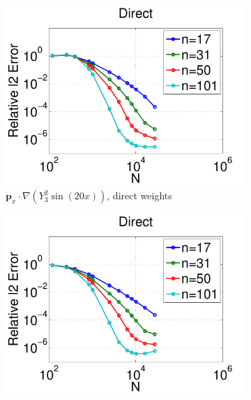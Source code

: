 \begin{figure}
	\centering
	\begin{subfigure}[t]{0.48\textwidth}
	\includegraphics[width=1.0\textwidth]{../figures/appendices/direct_vs_indirect_weights/compare_weight_generation/xsfc_vs_xsfc_alt_on_sph32_times_sine_20x/direct_rel_l2_error-eps-converted-to.pdf}
	\caption{$\mathbf{p}_{x} \cdot \nabla ( Y_{3}^{2} \sin(20 x))$, direct weights}
			\label{fig:direct_vs_indirect_relative_error_xsfc_direct}
	\end{subfigure}
	\begin{subfigure}[t]{0.48\textwidth}
	\includegraphics[width=1.0\textwidth]{../figures/appendices/direct_vs_indirect_weights/compare_weight_generation/lsfc_vs_px_grad_dot_px_grad/direct_rel_l2_error-eps-converted-to.pdf}

\end{subfigure}
\end{figure}
